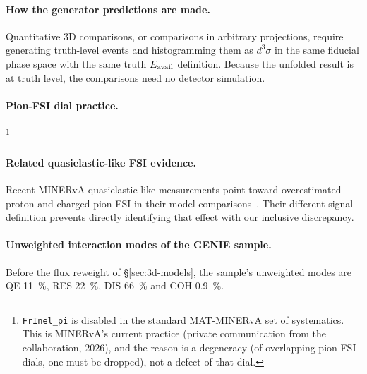 \paragraph{How the generator predictions are made.} Quantitative 3D comparisons, or comparisons in arbitrary projections, require generating truth-level events and histogramming them as $d^{3}\sigma$ in the same fiducial phase space with the same truth $E_{\mathrm{avail}}$ definition. Because the unfolded result is at truth level, the comparisons need no detector simulation.

\paragraph{Pion-FSI dial practice.} \footnote{\texttt{FrInel\_pi} is disabled in the standard MAT-MINERvA set of systematics. This is MINERvA's current practice (private communication from the collaboration, 2026), and the reason is a degeneracy (of overlapping pion-FSI dials, one must be dropped), not a defect of that dial.}

\paragraph{Related quasielastic-like FSI evidence.} Recent MINERvA quasielastic-like measurements point toward overestimated proton and charged-pion FSI in their model comparisons~\cite{MINERvA:2026qeleme}. Their different signal definition prevents directly identifying that effect with our inclusive discrepancy.

\paragraph{Unweighted interaction modes of the GENIE sample.} Before the flux reweight of \S\ref{sec:3d-models}, the sample's unweighted modes are QE \SI{11}{\percent}, RES \SI{22}{\percent}, DIS \SI{66}{\percent} and COH \SI{0.9}{\percent}.

